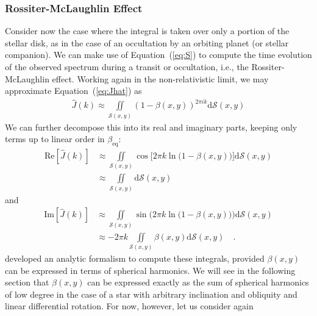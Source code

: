 \documentclass[modern]{aastex62}
\begin{document}
\subsubsection{Rossiter-McLaughlin Effect}
\label{sec:rmeffect}
%
Consider now the case where the integral is taken over only a portion
of the stellar disk, as in the case of an occultation by an orbiting planet
(or stellar companion). We can make use of Equation~(\ref{eq:S}) to
compute the time evolution of the observed spectrum during a transit
or occultation, i.e., the Rossiter-McLaughlin effect.
%
Working again in the non-relativistic limit, we may approximate
Equation~(\ref{eq:Jhat}) as
%
\begin{align}
    \label{eq:Jhat_approx}
    \hat{J}(k) \approx
        \iint\limits_{\mathcal{S}(x, y)}
        \left( 1 - \beta(x, y) \right) ^ {2\pi i k}
        \mathrm{d}\mathcal{S}(x, y)
\end{align}
%
We can further decompose this into its real and imaginary parts,
keeping only terms up to linear order in $\beta_\mathrm{eq}$:
%
\begin{align}
    \label{eq:Jhat_approx_re}
    \mathrm{Re}\left[\hat{J}(k)\right] 
    &\approx
        \iint\limits_{\mathcal{S}(x, y)}
        \cos \Big[ 2\pi k \ln\big(1 - \beta(x, y)\big) \Big]
        \mathrm{d}\mathcal{S}(x, y)
    \nonumber \\
    &\approx
        \iint\limits_{\mathcal{S}(x, y)}
        \mathrm{d}\mathcal{S}(x, y)
\end{align}
%
and
%
\begin{align}
    \label{eq:Jhat_approx_im}
    \mathrm{Im}\left[\hat{J}(k)\right] 
    &\approx
        \iint\limits_{\mathcal{S}(x, y)}
        \sin \Big( 2\pi k \ln\big(1 - \beta(x, y)\big) \Big)
        \mathrm{d}\mathcal{S}(x, y)
    \nonumber \\
    &\approx
        -2\pi k
        \iint\limits_{\mathcal{S}(x, y)}
        \beta(x, y)
        \mathrm{d}\mathcal{S}(x, y)
        \quad .
\end{align}
%
\cite{Luger2019} developed an analytic formalism to compute these 
integrals, provided $\beta(x, y)$ can be expressed in terms of
spherical harmonics. We will see in the following section that
$\beta(x, y)$ can be expressed exactly as the sum of
spherical harmonics of low degree in the case of a 
star with arbitrary inclination and obliquity and linear
differential rotation. For now, however, let us consider again
\end{document}
